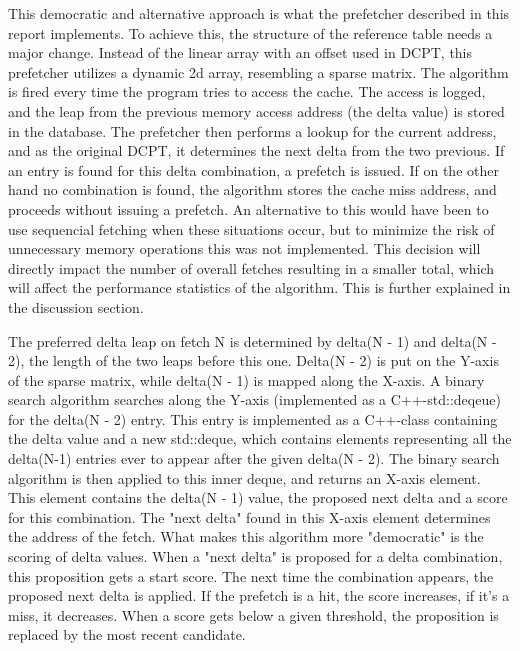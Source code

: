 This democratic and alternative approach is what the prefetcher described in this report implements. To achieve this, the structure of the reference table needs a major change. Instead of the linear array with an offset used in DCPT, this prefetcher utilizes a dynamic 2d array, resembling a sparse matrix. The algorithm is fired every time the program tries to access the cache. The access is logged, and the leap from the previous memory access address (the delta value) is stored in the database. The prefetcher then performs a lookup for the current address, and as the original DCPT, it determines the next delta from the two previous. If an entry is found for this delta combination, a prefetch is issued. If on the other hand no combination is found, the algorithm stores the cache miss address, and proceeds without issuing a prefetch. An alternative to this would have been to use sequencial fetching when these situations occur, but to minimize the risk of unnecessary memory operations this was not implemented. This decision will directly impact the number of overall fetches resulting in a smaller total, which will affect the performance statistics of the algorithm. This is further explained in the discussion section.   

The preferred delta leap on fetch N is determined by delta(N - 1) and delta(N - 2), the length of the two leaps before this one. Delta(N - 2) is put on the Y-axis of the sparse matrix, while delta(N - 1) is mapped along the X-axis. A binary search algorithm searches along the Y-axis (implemented as a C++-std::deqeue) for the delta(N - 2) entry. This entry is implemented as a C++-class containing the delta value and a new std::deque, which contains elements representing all the delta(N-1) entries ever to appear after the given delta(N - 2). The binary search algorithm is then applied to this inner deque, and returns an X-axis element. This element contains the delta(N - 1) value, the proposed next delta and a score for this combination. The "next delta" found in this X-axis element determines the address of the fetch. What makes this algorithm more "democratic" is the scoring of delta values. When a "next delta" is proposed for a delta combination, this proposition gets a start score. The next time the combination appears, the proposed next delta is applied. If the prefetch is a hit, the score increases, if it's a miss, it decreases. When a score gets below a given threshold, the proposition is replaced by the most recent candidate. 

